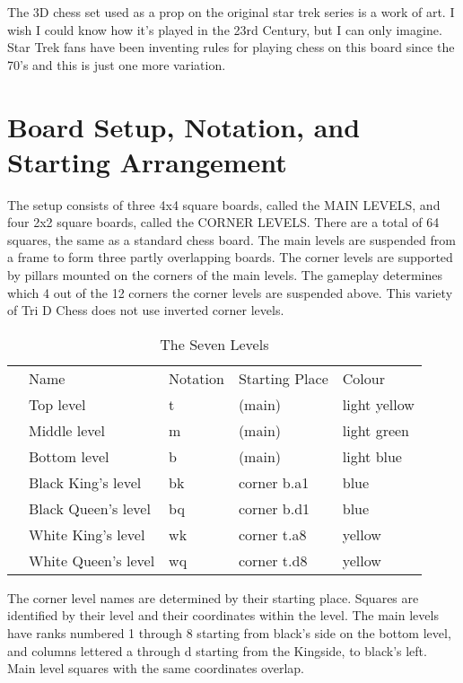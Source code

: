 \documentclass[12pt]{article} %
\begin{document}
The 3D chess set used as a prop on the original star trek series is a work of art.  I wish I could know how it's played in the 23rd Century, but I can only imagine.  Star Trek fans have been inventing rules for playing chess on this board since the 70's and this is just one more variation.  




\section{Board Setup, Notation, and Starting Arrangement}

The setup consists of three 4x4 square boards, called the MAIN LEVELS, and four 2x2 square boards, called the CORNER LEVELS.  There are a total of 64 squares, the same as a standard chess board.  The main levels are suspended from a frame to form three partly overlapping boards. The corner levels are supported by pillars mounted on the corners of the main levels.  The gameplay determines which 4 out of the 12 corners the corner levels are suspended above.  This variety of Tri D Chess does not use inverted corner levels.

\begin{table}[H]
\caption{The Seven Levels}
\label{levels}
\begin{tabular}{lllll}
 & Name & Notation & Starting Place & Colour \\
 & Top level & t & (main) & light yellow \\
 & Middle level & m & (main)  & light green \\
 & Bottom level & b & (main)  & light blue  \\
 & Black King's level & bk & corner b.a1 & blue  \\
 & Black Queen's level & bq & corner b.d1 & blue \\
 & White King's level & wk &  corner t.a8 & yellow \\
 & White Queen's level & wq & corner t.d8 & yellow  
\end{tabular}
\end{table}

The corner level names are determined by their starting place.  Squares are identified by their level and their coordinates within the level.  The main levels have ranks numbered 1 through 8 starting from black's side on the bottom level, and columns lettered a through d starting from the Kingside, to black's left.  Main level squares with the same coordinates overlap.
\end{document}
